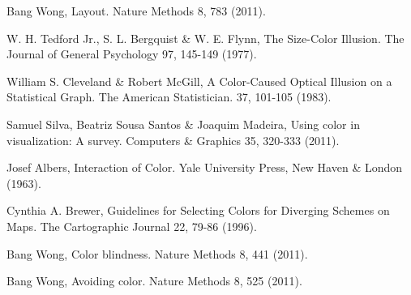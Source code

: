 \documentclass[letterpaper]{article}
\begin{document}
\begin{thebibliography}{1}
Bang Wong, Layout. Nature Methods 8, 783 (2011).

W. H. Tedford Jr., S. L. Bergquist \& W. E. Flynn, The Size-Color Illusion. The Journal of General Psychology 97, 145-149 (1977).

William S. Cleveland \& Robert McGill, A Color-Caused Optical Illusion on a Statistical Graph. The American Statistician. 37, 101-105 (1983).

Samuel Silva, Beatriz Sousa Santos \& Joaquim Madeira, Using color in visualization: A survey. Computers \& Graphics 35, 320-333 (2011).

Josef Albers, Interaction of Color. Yale University Press, New Haven \& London (1963).

Cynthia A. Brewer, Guidelines for Selecting Colors for Diverging Schemes on Maps. The Cartographic Journal 22, 79-86 (1996).

Bang Wong, Color blindness. Nature Methods 8, 441 (2011).

Bang Wong, Avoiding color. Nature Methods 8, 525 (2011).

\end{thebibliography}
\end{document}

